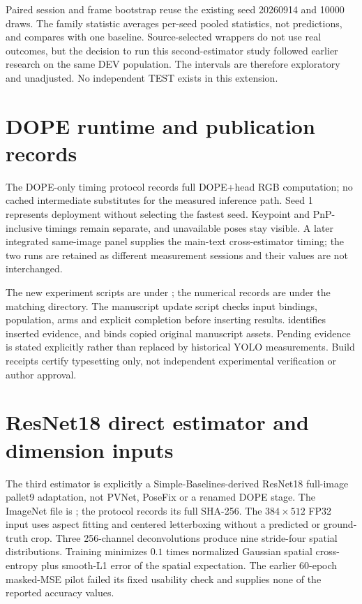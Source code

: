 \documentclass[10pt]{article}
\begin{document}
Paired session and frame bootstrap reuse the existing seed 20260914 and 10000 draws. The family statistic averages per-seed pooled statistics, not predictions, and compares with one baseline. Source-selected wrappers do not use real outcomes, but the decision to run this second-estimator study followed earlier research on the same DEV population. The intervals are therefore exploratory and unadjusted. No independent TEST exists in this extension.

\section{DOPE runtime and publication records}

The DOPE-only timing protocol records full DOPE+head RGB computation; no cached intermediate substitutes for the measured inference path. Seed 1 represents deployment without selecting the fastest seed. Keypoint and PnP-inclusive timings remain separate, and unavailable poses stay visible. A later integrated same-image panel supplies the main-text cross-estimator timing; the two runs are retained as different measurement sessions and their values are not interchanged.

The new experiment scripts are under ; the numerical records are under the matching  directory. The manuscript update script checks input bindings, population, arms and explicit completion before inserting results.  identifies inserted evidence, and  binds copied original manuscript assets. Pending evidence is stated explicitly rather than replaced by historical YOLO measurements. Build receipts certify typesetting only, not independent experimental verification or author approval.

\section{ResNet18 direct estimator and dimension inputs}
\ResnetMainStatus{}
The third estimator is explicitly a Simple-Baselines-derived ResNet18 full-image pallet9 adaptation, not PVNet, PoseFix or a renamed DOPE stage. The ImageNet file is ; the protocol records its full SHA-256. The $384\times512$ FP32 input uses aspect fitting and centered letterboxing without a predicted or ground-truth crop. Three 256-channel deconvolutions produce nine stride-four spatial distributions. Training minimizes $0.1$ times normalized Gaussian spatial cross-entropy plus smooth-L1 error of the spatial expectation. The earlier 60-epoch masked-MSE pilot failed its fixed usability check and supplies none of the reported accuracy values.
\end{document}
